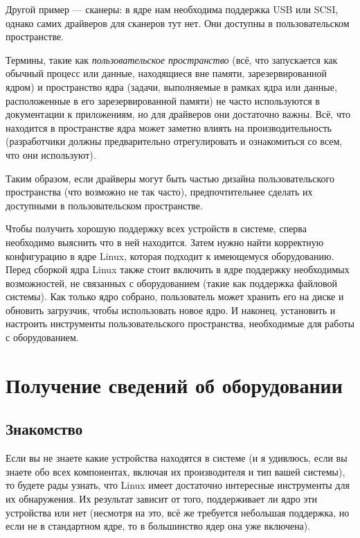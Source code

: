 \documentclass[10pt]{book}
\begin{document}
Другой пример — сканеры: в ядре нам необходима поддержка USB или SCSI, однако самих драйверов для сканеров тут нет. Они доступны в пользовательском пространстве.

Термины, такие как \textit{пользовательское пространство} (всё, что запускается как обычный процесс или данные, находящиеся вне памяти, зарезервированной ядром) и пространство ядра (задачи, выполняемые в рамках ядра или данные, расположенные в его зарезервированной памяти) не часто используются в документации к приложениям, но для драйверов они достаточно важны. Всё, что находится в пространстве ядра может заметно влиять на производительность (разработчики должны предварительно отрегулировать и ознакомиться со всем, что они используют). 

Таким образом, если драйверы могут быть частью дизайна пользовательского пространства (что возможно не так часто), предпочтительнее сделать их доступными в пользовательском пространстве.

Чтобы получить хорошую поддержку всех устройств в системе, сперва необходимо выяснить что в ней находится. Затем нужно найти корректную конфигурацию в ядре Linux, которая подходит к имеющемуся оборудованию. Перед сборкой ядра Linux также стоит включить в ядре поддержку необходимых возможностей, не связанных с оборудованием (такие как поддержка файловой системы). Как только ядро собрано, пользователь может хранить его на диске и обновить загрузчик, чтобы использовать новое ядро. И наконец, установить и настроить инструменты пользовательского пространства, необходимые для работы с оборудованием.

\section{Получение сведений об оборудовании}

\subsection {Знакомство}

Если вы не знаете какие устройства находятся в системе (и я удивлюсь, если вы знаете обо всех компонентах, включая их производителя и тип вашей системы), то будете рады узнать, что Linux имеет достаточно интересные инструменты для их обнаружения. Их результат зависит от того, поддерживает ли ядро эти устройства или нет (несмотря на это, всё же требуется небольшая поддержка, но если не в стандартном ядре, то в большинство ядер она уже включена).
\end{document}
